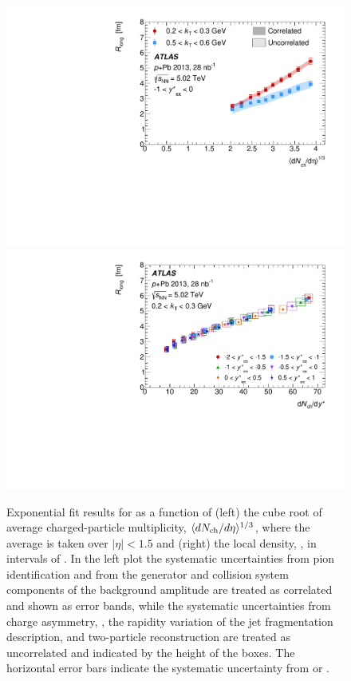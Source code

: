 \begin{figure}[t]
\centering
\includegraphics[width=0.49\linewidth]{canqosl_Rlong_vs_avg_mult.pdf}
\includegraphics[width=0.49\linewidth]{canqosl_Rlong_kt1_vs_mult.pdf}
\caption{Exponential fit results for \Rlong as a function of (left) the cube root of average charged-particle multiplicity, $\langle d\mbox{$N_{\mathrm{ch}}$}/d\eta\rangle^{1/3}$, where the average is taken over $|\eta| < 1.5$  and (right) the local density, \dNdy, in intervals of \kys. In the left plot the systematic uncertainties from pion identification and from the generator and collision system components of the background amplitude are treated as correlated and shown as error bands, while the systematic uncertainties from charge asymmetry, \Reff, the rapidity variation of the jet fragmentation description, and two-particle reconstruction are treated as uncorrelated and indicated by the height of the boxes. The horizontal error bars indicate the systematic uncertainty from \avgdNdeta or \dNdy.}
\label{fig:results_Rlong_mult}
\end{figure}

\FloatBarrier


